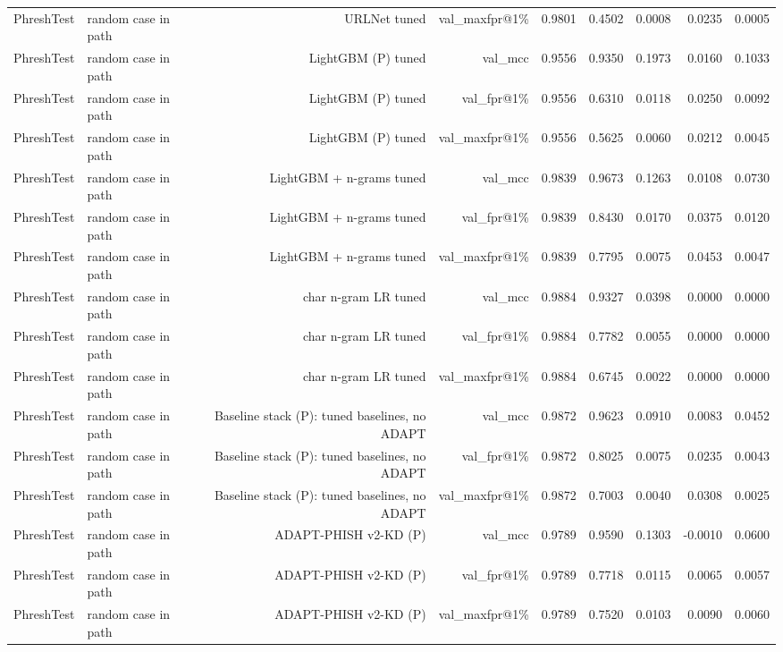 \begin{table}[t]
\begin{tabular}{llrrrrrrr}
PhreshTest & random case in path & URLNet tuned & val\_maxfpr@1\% & 0.9801 & 0.4502 & 0.0008 & 0.0235 & 0.0005 \\
PhreshTest & random case in path & LightGBM (P) tuned & val\_mcc & 0.9556 & 0.9350 & 0.1973 & 0.0160 & 0.1033 \\
PhreshTest & random case in path & LightGBM (P) tuned & val\_fpr@1\% & 0.9556 & 0.6310 & 0.0118 & 0.0250 & 0.0092 \\
PhreshTest & random case in path & LightGBM (P) tuned & val\_maxfpr@1\% & 0.9556 & 0.5625 & 0.0060 & 0.0212 & 0.0045 \\
PhreshTest & random case in path & LightGBM + n-grams tuned & val\_mcc & 0.9839 & 0.9673 & 0.1263 & 0.0108 & 0.0730 \\
PhreshTest & random case in path & LightGBM + n-grams tuned & val\_fpr@1\% & 0.9839 & 0.8430 & 0.0170 & 0.0375 & 0.0120 \\
PhreshTest & random case in path & LightGBM + n-grams tuned & val\_maxfpr@1\% & 0.9839 & 0.7795 & 0.0075 & 0.0453 & 0.0047 \\
PhreshTest & random case in path & char n-gram LR tuned & val\_mcc & 0.9884 & 0.9327 & 0.0398 & 0.0000 & 0.0000 \\
PhreshTest & random case in path & char n-gram LR tuned & val\_fpr@1\% & 0.9884 & 0.7782 & 0.0055 & 0.0000 & 0.0000 \\
PhreshTest & random case in path & char n-gram LR tuned & val\_maxfpr@1\% & 0.9884 & 0.6745 & 0.0022 & 0.0000 & 0.0000 \\
PhreshTest & random case in path & Baseline stack (P): tuned baselines, no ADAPT & val\_mcc & 0.9872 & 0.9623 & 0.0910 & 0.0083 & 0.0452 \\
PhreshTest & random case in path & Baseline stack (P): tuned baselines, no ADAPT & val\_fpr@1\% & 0.9872 & 0.8025 & 0.0075 & 0.0235 & 0.0043 \\
PhreshTest & random case in path & Baseline stack (P): tuned baselines, no ADAPT & val\_maxfpr@1\% & 0.9872 & 0.7003 & 0.0040 & 0.0308 & 0.0025 \\
PhreshTest & random case in path & ADAPT-PHISH v2-KD (P) & val\_mcc & 0.9789 & 0.9590 & 0.1303 & -0.0010 & 0.0600 \\
PhreshTest & random case in path & ADAPT-PHISH v2-KD (P) & val\_fpr@1\% & 0.9789 & 0.7718 & 0.0115 & 0.0065 & 0.0057 \\
PhreshTest & random case in path & ADAPT-PHISH v2-KD (P) & val\_maxfpr@1\% & 0.9789 & 0.7520 & 0.0103 & 0.0090 & 0.0060 \\

\end{tabular}
\end{table}
